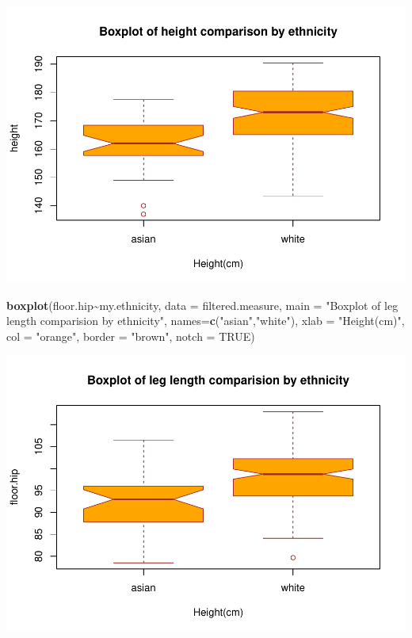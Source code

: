 \documentclass[]{article}
\newenvironment{Shaded}{\begin{snugshade}}{\end{snugshade}}
\newcommand{\DataTypeTok}[1]{\textcolor[rgb]{0.13,0.29,0.53}{#1}}
\newcommand{\KeywordTok}[1]{\textcolor[rgb]{0.13,0.29,0.53}{\textbf{#1}}}
\newcommand{\NormalTok}[1]{#1}
\newcommand{\OperatorTok}[1]{\textcolor[rgb]{0.81,0.36,0.00}{\textbf{#1}}}
\newcommand{\OtherTok}[1]{\textcolor[rgb]{0.56,0.35,0.01}{#1}}
\newcommand{\StringTok}[1]{\textcolor[rgb]{0.31,0.60,0.02}{#1}}
\begin{document}
\includegraphics{project-measure_files/figure-latex/box_plots-3.pdf}

\begin{Shaded}
\begin{Highlighting}[]
\KeywordTok{boxplot}\NormalTok{(floor.hip}\OperatorTok{\textasciitilde{}}\NormalTok{my.ethnicity,}
\DataTypeTok{data =}\NormalTok{ filtered.measure,}
\DataTypeTok{main =} \StringTok{"Boxplot of leg length comparision by ethnicity"}\NormalTok{,}
\DataTypeTok{names=}\KeywordTok{c}\NormalTok{(}\StringTok{"asian"}\NormalTok{,}\StringTok{"white"}\NormalTok{),}
\DataTypeTok{xlab =} \StringTok{"Height(cm)"}\NormalTok{,}
\DataTypeTok{col =} \StringTok{"orange"}\NormalTok{,}
\DataTypeTok{border =} \StringTok{"brown"}\NormalTok{,}
\DataTypeTok{notch =} \OtherTok{TRUE}\NormalTok{)}
\end{Highlighting}
\end{Shaded}

\includegraphics{project-measure_files/figure-latex/box_plots-4.pdf}
\end{document}
